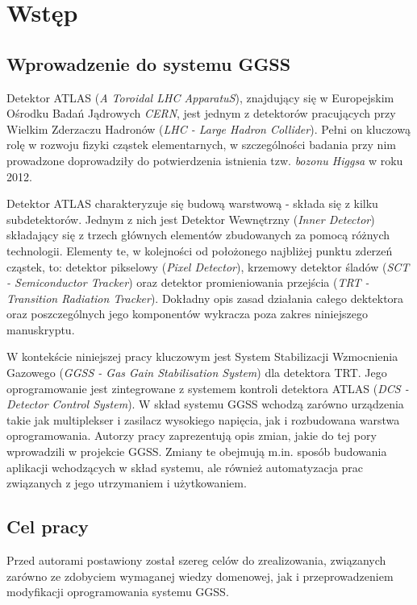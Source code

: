 \chapter{Wstęp}
\label{cha:wstep}

\section{Wprowadzenie do systemu GGSS}
Detektor ATLAS (\textit{A Toroidal LHC ApparatuS}), znajdujący się w Europejskim Ośrodku Badań Jądrowych \textit{CERN}, jest jednym z detektorów pracujących przy Wielkim Zderzaczu Hadronów (\textit{LHC - Large Hadron Collider}). Pełni on kluczową rolę w rozwoju fizyki cząstek elementarnych, w szczególności badania przy nim prowadzone doprowadziły do potwierdzenia istnienia tzw. \textit{bozonu Higgsa} w roku 2012. \par

Detektor ATLAS charakteryzuje się budową warstwową - składa się z kilku subdetektorów\cite{ATLAS_AGH_1}. Jednym z nich jest Detektor Wewnętrzny (\textit{Inner Detector}) składający się z trzech głównych elementów zbudowanych za pomocą różnych technologii. Elementy te, w kolejności od położonego najbliżej punktu zderzeń cząstek, to: detektor pikselowy (\textit{Pixel Detector}), krzemowy detektor śladów (\textit{SCT - Semiconductor Tracker}) oraz detektor promieniowania przejścia (\textit{TRT - Transition Radiation Tracker}). Dokładny opis zasad działania całego dektektora oraz poszczególnych jego komponentów wykracza poza zakres niniejszego manuskryptu.\par

W kontekście niniejszej pracy kluczowym jest System Stabilizacji Wzmocnienia Gazowego (\textit{GGSS - Gas Gain Stabilisation System}) dla detektora TRT. Jego oprogramowanie jest zintegrowane z systemem kontroli detektora ATLAS (\textit{DCS - Detector Control System}). W skład systemu GGSS wchodzą zarówno urządzenia takie jak multiplekser i zasilacz wysokiego napięcia, jak i rozbudowana warstwa oprogramowania. Autorzy pracy zaprezentują opis zmian, jakie do tej pory wprowadzili w projekcie GGSS. Zmiany te obejmują m.in. sposób budowania aplikacji wchodzących w skład systemu, ale również automatyzacja prac związanych z jego utrzymaniem i użytkowaniem.



\section{Cel pracy}
Przed autorami postawiony został szereg celów do zrealizowania, związanych zarówno ze zdobyciem wymaganej wiedzy domenowej, jak i przeprowadzeniem modyfikacji oprogramowania systemu GGSS. \par

